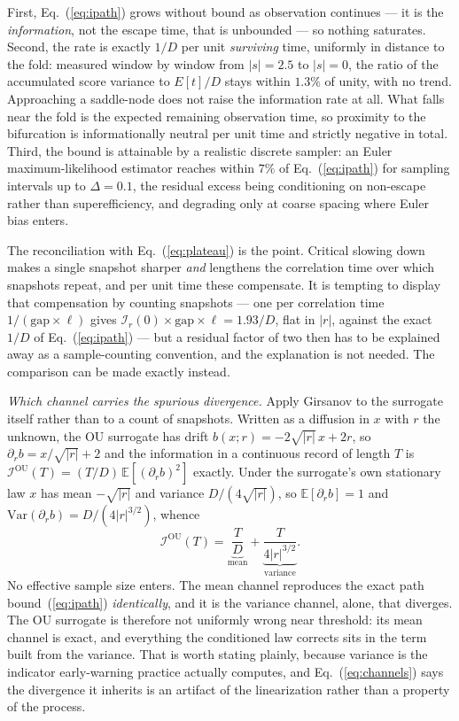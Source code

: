 \documentclass[%
 aip,
 cha,
 amsmath,amssymb,
 reprint,
 superscriptaddress,
 floatfix,
]{revtex4-2}
\newcommand{\Ifish}{\mathcal{I}}
\begin{document}
First, Eq.~(\ref{eq:ipath}) grows without bound as observation continues --- it is the \emph{information}, not the escape time, that is unbounded --- so nothing saturates.  Second, the rate is exactly $1/D$ per unit \emph{surviving} time, uniformly in distance to the fold: measured window by window from $|s|=2.5$ to $|s|=0$, the ratio of the accumulated score variance to $E[t]/D$ stays within $1.3\%$ of unity, with no trend.  Approaching a saddle-node does not raise the information rate at all.  What falls near the fold is the expected remaining observation time, so proximity to the bifurcation is informationally neutral per unit time and strictly negative in total.  Third, the bound is attainable by a realistic discrete sampler: an Euler maximum-likelihood estimator reaches within $7\%$ of Eq.~(\ref{eq:ipath}) for sampling intervals up to $\Delta=0.1$, the residual excess being conditioning on non-escape rather than superefficiency, and degrading only at coarse spacing where Euler bias enters.

The reconciliation with Eq.~(\ref{eq:plateau}) is the point.  Critical slowing down makes a single snapshot sharper \emph{and} lengthens the correlation time over which snapshots repeat, and per unit time these compensate.  It is tempting to display that compensation by counting snapshots --- one per correlation time $1/(\mathrm{gap}\times\ell)$ gives $\Ifish_r(0)\times\mathrm{gap}\times\ell=1.93/D$, flat in $|r|$, against the exact $1/D$ of Eq.~(\ref{eq:ipath}) --- but a residual factor of two then has to be explained away as a sample-counting convention, and the explanation is not needed.  The comparison can be made exactly instead.

\emph{Which channel carries the spurious divergence.}  Apply Girsanov to the surrogate itself rather than to a count of snapshots.  Written as a diffusion in $x$ with $r$ the unknown, the OU surrogate has drift $b(x;r)=-2\sqrt{|r|}\,x+2r$, so $\partial_r b=x/\sqrt{|r|}+2$ and the information in a continuous record of length $T$ is $\Ifish^{\mathrm{OU}}(T)=(T/D)\,\mathbb{E}[(\partial_r b)^2]$ exactly.  Under the surrogate's own stationary law $x$ has mean $-\sqrt{|r|}$ and variance $D/(4\sqrt{|r|})$, so $\mathbb{E}[\partial_r b]=1$ and $\mathrm{Var}(\partial_r b)=D/(4|r|^{3/2})$, whence
\begin{equation}
\label{eq:channels}
\Ifish^{\mathrm{OU}}(T)
=\underbrace{\frac{T}{D}}_{\text{mean}}
+\underbrace{\frac{T}{4|r|^{3/2}}}_{\text{variance}} .
\end{equation}
No effective sample size enters.  The mean channel reproduces the exact path bound~(\ref{eq:ipath}) \emph{identically}, and it is the variance channel, alone, that diverges.  The OU surrogate is therefore not uniformly wrong near threshold: its mean channel is exact, and everything the conditioned law corrects sits in the term built from the variance.  That is worth stating plainly, because variance is the indicator early-warning practice actually computes, and Eq.~(\ref{eq:channels}) says the divergence it inherits is an artifact of the linearization rather than a property of the process.
\end{document}
